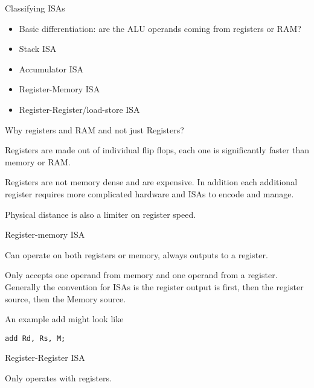 \documentclass{report}
\begin{document}
\begin{description}
    \item Classifying ISAs
        \begin{itemize}
            \item Basic differentiation: are the ALU operands coming from
                registers or RAM?

            \item Stack ISA
            \item Accumulator ISA
            \item Register-Memory ISA
            \item Register-Register/load-store ISA
        \end{itemize}


        \begin{mdframed}
            {\Large Why registers and RAM and not just Registers?}

            Registers are made out of individual flip flops,
            each one is significantly faster than memory or
            RAM.

            Registers are not memory dense and are expensive.
            In addition each additional register requires more
            complicated hardware and ISAs to encode and manage.

            Physical distance is also a limiter on register speed.
        \end{mdframed}

        \begin{mdframed}
            {\Large Register-memory ISA}

            Can operate on both registers or memory, always outputs to a register.

            Only accepts one operand from memory and one operand from a register.
            Generally the convention for ISAs is the register output is first,
            then the register source, then the Memory source.

            An example add might look like
        \end{mdframed}

    \begin{lstlisting}[language={[x86asm]Assembler}]
            add Rd, Rs, M;
    \end{lstlisting}

        \begin{mdframed}
            {\Large Register-Register ISA}

            Only operates with registers.


\end{mdframed}
\end{description}
\end{document}
